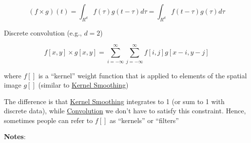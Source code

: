 \documentclass[
]{book}
\begin{document}
\[
(f \times g) (t) = \int_{R^d} f(\tau) g(t - \tau) d \tau = \int_{R^d} f(t - \tau) g(\tau) d\tau
\]

Discrete convolution (e.g., \(d = 2\))

\[
f[x, y ] \times g [x, y] = \sum_{i = - \infty}^\infty \sum_{j = - \infty}^\infty f[i,j] g[x-i, y - j]
\]

where \(f[]\) is a ``kernel'' weight function that is applied to elements of the spatial image \(g[]\) (similar to \protect\hyperlink{kernel-smoothing}{Kernel Smoothing})

The difference is that \protect\hyperlink{kernel-smoothing}{Kernel Smoothing} integrates to 1 (or sum to 1 with discrete data), while \protect\hyperlink{convolution}{Convolution} we don't have to satisfy this constraint. Hence, sometimes people can refer to \(f[]\) as ``kernels'' or ``filters''

\textbf{Notes}:
\end{document}
